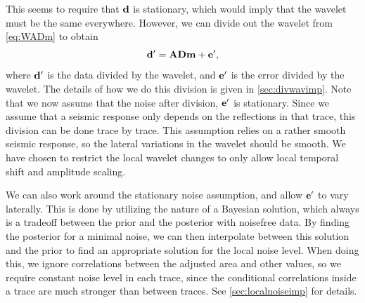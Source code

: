 This seems to require that $\mathbf{d}$ is stationary, which would imply that the wavelet must be the same everywhere. However, we can divide out the wavelet from \autoref{eq:WADm} to obtain
\begin{equation}
\label{eq:ADm}
\mathbf{d^\prime} = \mathbf{A}\mathbf{D}\mathbf{m} + \mathbf{e^\prime},
\end{equation}
where $\mathbf{d^\prime}$ is the data divided by the wavelet, and $\mathbf{e^\prime}$ is the error divided by the wavelet. The details of how we do this division is given in \autoref{sec:divwavimp}. Note that we now assume that the noise after division, $\mathbf{e^\prime}$ is stationary. Since we assume that a seismic response only depends on the reflections in that trace, this division can be done trace by trace. This assumption relies on a rather smooth seismic response, so the lateral variations in the wavelet should be smooth. We have chosen to restrict the local wavelet changes to only allow local temporal shift and amplitude scaling.

We can also work around the stationary noise assumption, and allow $\mathbf{e^\prime}$ to vary laterally. This is done by utilizing the nature of a Bayesian solution, which always is a tradeoff between the prior and the posterior with noisefree data. By finding the posterior for a minimal noise, we can then interpolate between this solution and the prior to find an appropriate solution for the local noise level. When doing this, we ignore correlations between the adjusted area and other values, so we require constant noise level in each trace, since the conditional correlations inside a trace are much stronger than between traces. See \autoref{sec:localnoiseimp} for details.

